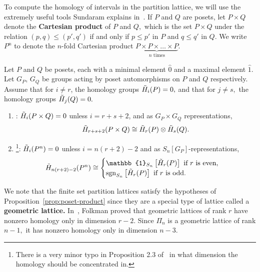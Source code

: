 \documentclass[ALCO, Unicode]{cedram}
\def\sgn{\mathrm{sgn}}
\begin{document}
To compute the homology of intervals in the partition lattice, we will use the extremely useful tools Sundaram explains in~\cite{SundaramJerusalem}. If $P$ and $Q$ are posets, let \textbf{$P \times Q$} denote the \textbf{Cartesian product} of $P$ and $Q,$ which is the set $P\times Q$ under the relation $(p, q) \leq (p', q')$ if and only if $p \leq p'$ in $P$ and $q \leq q'$ in $Q.$ We write \textbf{$P^n$} to denote the $n$-fold Cartesian product $\underbrace{P \times P \times \ldots \times P}_{n \text{ times}}.$

\begin{prop} \label{prop:poset-product}
Let $P$ and $Q$ be posets, each with a minimal element $\hat{0}$ and a maximal element $\hat{1}.$ Let $G_P$, $G_Q$ be groups acting by poset automorphisms on $P$ and $Q$ respectively. Assume that for $i \neq r$, the homology groups $\Tilde{H}_i(P) = 0,$ and that for $j \neq s,$ the homology groups $\Tilde{H}_j(Q) = 0.$ 

\begin{enumerate}
    \item[(i)]\cite[Proposition 2.1]{SundaramJerusalem}: $\Tilde{H}_i(P \times Q) = 0$ unless $i = r + s + 2$, and as $G_P \times G_Q$ representations, \[\Tilde{H}_{r + s + 2}(P \times Q) \cong \Tilde{H}_{r}(P) \otimes \Tilde{H}_{s}(Q).\]
    \item[(ii)]\cite[Proposition 2.3]{SundaramJerusalem}\footnote{There is a very minor typo in Proposition 2.3 of~\cite{SundaramJerusalem} in what dimension the homology should be concentrated in.}: $\Tilde{H}_i(P^n) = 0$ unless $i = n(r + 2) - 2$ and as $S_n[G_P]$-representations, 
    \begin{align*}
        \Tilde{H}_{n(r + 2) - 2}(P^n) \cong \begin{cases}
        \mathbb{1}_{S_n}\left[\Tilde{H}_r(P)\right] \text{ if $r$ is even},\\
        \mathbb{\sgn}_{S_n}\left[\Tilde{H}_r(P)\right] \text{ if $r$ is odd}.
    \end{cases}
    \end{align*}
\end{enumerate}
\end{prop} 

We note that the finite set partition lattices satisfy the hypotheses of Proposition~\ref{prop:poset-product} since they are a special type of lattice called a \textbf{geometric lattice.} In~\cite{Folkman}, Folkman proved that geometric lattices of rank $r$ have nonzero homology only in dimension $r - 2.$ Since $\Pi_n$ is a geometric lattice of rank $n - 1,$ it has nonzero homology only in dimension $n - 3.$
\end{document}
